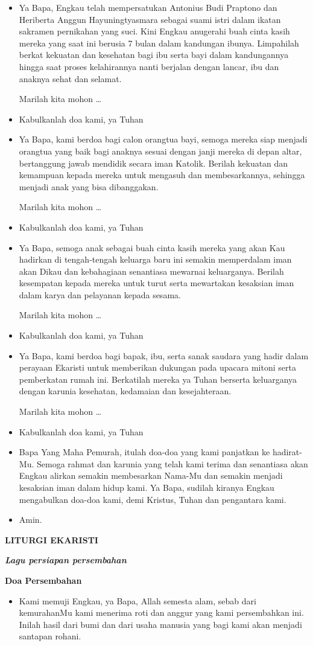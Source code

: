 \documentclass[12pt,twoside]{book}
\makeatletter
\newcommand{\judul}[1]{%
  {\parindent \z@ \centering \normalfont
    \interlinepenalty\@M \large \bfseries #1\par\nobreak \vskip 20\p@ }}
\newcommand{\subjudul}[1]{%
  {\parindent \z@ \normalfont
    \interlinepenalty\@M \bfseries #1\par\nobreak \vskip 20\p@ }}
\newcommand{\lagu}[1]{%
  {\parindent \z@ \normalfont
    \interlinepenalty\@M \bfseries \emph{#1}\par\nobreak \vskip 20\p@ }}
\newcommand{\BU}[1]{\begin{itemize} \item[U:] #1 \end{itemize}}
\newcommand{\BI}[1]{\begin{itemize} \item[I:] #1 \end{itemize}}
\newcommand{\BP}[1]{\begin{itemize} \item[P:] #1 \end{itemize}}
\newcommand{\calonibu}{Heriberta Anggun Hayuningtyasmara\xspace}
\newcommand{\calonayah}{Antonius Budi Praptono\xspace}
\makeatother
\begin{document}
\BP{Ya Bapa, Engkau telah mempersatukan \calonayah dan \calonibu sebagai suami istri dalam ikatan sakramen pernikahan yang suci. Kini Engkau anugerahi buah cinta kasih mereka yang saat ini berusia 7 bulan dalam kandungan ibunya. Limpahilah berkat kekuatan dan kesehatan bagi ibu serta bayi dalam kandungannya hingga saat proses kelahirannya nanti berjalan dengan lancar, ibu dan anaknya sehat dan selamat.

Marilah kita mohon \ldots}

\BU{Kabulkanlah doa kami, ya Tuhan}

\BP{Ya Bapa, kami berdoa bagi calon orangtua bayi, semoga mereka siap menjadi orangtua yang baik bagi anaknya sesuai dengan janji mereka di depan altar, bertanggung jawab mendidik secara iman Katolik. Berilah kekuatan dan kemampuan kepada mereka untuk mengasuh dan membesarkannya, sehingga menjadi anak yang bisa dibanggakan.

Marilah kita mohon \ldots}

\BU{Kabulkanlah doa kami, ya Tuhan}

\BP{Ya Bapa, semoga anak sebagai buah cinta kasih mereka yang akan Kau hadirkan di tengah-tengah keluarga baru ini semakin memperdalam iman akan Dikau dan kebahagiaan senantiasa mewarnai keluarganya. Berilah kesempatan kepada mereka untuk turut serta mewartakan kesaksian iman dalam karya dan pelayanan kepada sesama.

Marilah kita mohon \ldots}

\BU{Kabulkanlah doa kami, ya Tuhan}

\BP{Ya Bapa, kami berdoa bagi bapak, ibu, serta sanak saudara yang hadir dalam perayaan Ekaristi untuk memberikan dukungan pada upacara mitoni serta pemberkatan rumah ini. Berkatilah mereka ya Tuhan berserta keluarganya dengan karunia kesehatan, kedamaian dan kesejahteraan.

Marilah kita mohon \ldots}

\BU{Kabulkanlah doa kami, ya Tuhan}

\BI{Bapa Yang Maha Pemurah, itulah doa-doa yang kami panjatkan ke hadirat-Mu. Semoga rahmat dan karunia yang telah kami terima dan senantiasa akan Engkau alirkan semakin membesarkan Nama-Mu dan semakin menjadi kesaksian iman dalam hidup kami. Ya Bapa, sudilah kiranya Engkau mengabulkan doa-doa kami, demi Kristus, Tuhan dan pengantara kami.}

\BU{Amin.}

\judul{LITURGI EKARISTI}

\lagu{Lagu persiapan persembahan}

\subjudul{Doa Persembahan}
\BI{Kami memuji Engkau, ya Bapa, Allah semesta alam, sebab dari kemurahanMu kami menerima roti dan anggur yang kami persembahkan ini. Inilah hasil dari bumi dan dari usaha manusia yang bagi kami akan menjadi santapan rohani.}
 
\end{document}
